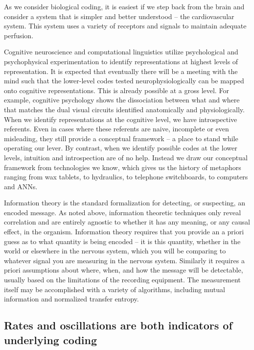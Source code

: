 \documentclass[12pt]{article}
\begin{document}
As we consider biological coding, it is easiest if we step back from the brain and consider a system that is simpler and better understood -- the cardiovascular system. This
system uses a variety of receptors and signals to maintain adequate perfusion.

Cognitive neuroscience and computational linguistics utilize psychological and psychophysical experimentation to identify representations at highest levels of representation. 
It is expected that eventually there will be a meeting with the mind such that the lower-level codes tested neurophysiologically can be mapped onto cognitive representations.
This is already possible at a gross level. For example, cognitive psychology shows the dissociation between what and where that matches the dual visual circuits identified
anatomically and physiologically.  When we identify representations at the cognitive level, we have introspective referents. Even in cases where these referents are naive,
incomplete or even misleading, they still provide a conceptual framework -- a place to stand while operating our lever. By contrast, when we identify possible codes at the
lower levels, intuition and introspection are of no help. Instead we draw our conceptual framework from technologies we know, which gives us the history of metaphors ranging
from wax tablets, to hydraulics, to telephone switchboards, to computers and ANNs.

Information theory is the standard formalization for detecting, or suspecting, an encoded message. As noted above, information theoretic techniques only reveal correlation and
are entirely agnostic to whether it has any meaning, or any causal effect, in the organism. Information theory requires that you provide an a priori guess as to what quantity
is being encoded -- it is this quantity, whether in the world or elsewhere in the nervous system, which you will be comparing to whatever signal you are measuring in the
nervous system. Similarly it requires a priori assumptions about where, when, and how the message will be detectable, usually based on the limitations of the recording
equipment. The measurement itself may be accomplished with a variety of algorithms, including mutual information and normalized transfer entropy.

\subsection{Rates and oscillations are both indicators of underlying coding}
\end{document}

